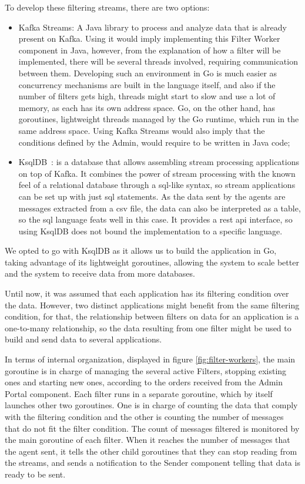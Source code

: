 To develop these filtering streams, there are two options:
\begin{itemize}
    \item Kafka Streams: A Java library to process and analyze data that is already present on Kafka.
        Using it would imply implementing this Filter Worker component in Java, however, from the explanation of how a filter will be implemented, there will be several threads involved, requiring communication between them.
        Developing such an environment in Go is much easier as concurrency mechanisms are built in the language itself, and also if the number of filters gets high, threads might start to slow and use a lot of memory, as each has its own address space.
        Go, on the other hand, has goroutines, lightweight threads managed by the Go runtime, which run in the same address space.
        Using Kafka Streams would also imply that the conditions defined by the Admin, would require to be written in Java code;
    \item KsqlDB~\cite{ksql}: is a database that allows assembling stream processing applications on top of Kafka.
        It combines the power of stream processing with the known feel of a relational database through a \gls{sql}-like syntax, so stream applications can be set up with just \gls{sql} statements.
        As the data sent by the agents are messages extracted from a \gls{csv} file, the data can also be interpreted as a table, so the \gls{sql} language feats well in this case.
        It provides a \gls{rest} \gls{api} interface, so using KsqlDB does not bound the implementation to a specific language.
\end{itemize}

We opted to go with KsqlDB as it allows us to build the application in Go, taking advantage of its lightweight goroutines, allowing the system to scale better and the system to receive data from more databases.

Until now, it was assumed that each application has its filtering condition over the data.
However, two distinct applications might benefit from the same filtering condition, for that, the relationship between filters on data for an application is a one-to-many relationship, so the data resulting from one filter might be used to build and send data to several applications.

In terms of internal organization, displayed in figure \ref{fig:filter-workers}, the main goroutine is in charge of managing the several active Filters, stopping existing ones and starting new ones, according to the orders received from the Admin Portal component.
Each filter runs in a separate goroutine, which by itself launches other two goroutines.
One is in charge of counting the data that comply with the filtering condition and the other is counting the number of messages that do not fit the filter condition.
The count of messages filtered is monitored by the main goroutine of each filter.
When it reaches the number of messages that the agent sent, it tells the other child goroutines that they can stop reading from the streams, and sends a notification to the Sender component telling that data is ready to be sent.

